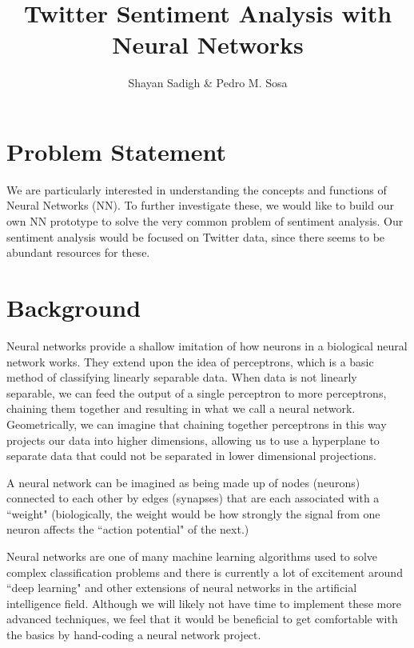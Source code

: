 \documentclass[]{article}
\title{Twitter Sentiment Analysis with Neural Networks}
\author{Shayan Sadigh \& Pedro M. Sosa}
\begin{document}
\maketitle

\section{Problem Statement}

\par We are particularly interested in understanding the concepts and functions of Neural Networks (NN). To further investigate these, we would like to build our own NN prototype to solve the very common problem of sentiment analysis. Our sentiment analysis would be focused on Twitter data, since there seems to be abundant resources for these.

\section{Background}

\par Neural networks provide a shallow imitation of how neurons in a biological neural network works. They extend upon the idea of perceptrons, which is a basic method of classifying linearly separable data. When data is not linearly separable, we can feed the output of a single perceptron to more perceptrons, chaining them together and resulting in what we call a neural network. Geometrically, we can imagine that chaining together perceptrons in this way projects our data into higher dimensions, allowing us to use a hyperplane to separate data that could not be separated in lower dimensional projections.

\par A neural network can be imagined as being made up of nodes (neurons) connected to each other by edges (synapses) that are each associated with a ``weight" (biologically, the weight would be how strongly the signal from one neuron affects the ``action potential" of the next.)

\par Neural networks are one of many machine learning algorithms used to solve complex classification problems and there is currently a lot of excitement around ``deep learning" and other extensions of neural networks in the artificial intelligence field. Although we will likely not have time to implement these more advanced techniques, we feel that it would be beneficial to get comfortable with the basics by hand-coding a neural network project.
\end{document}
